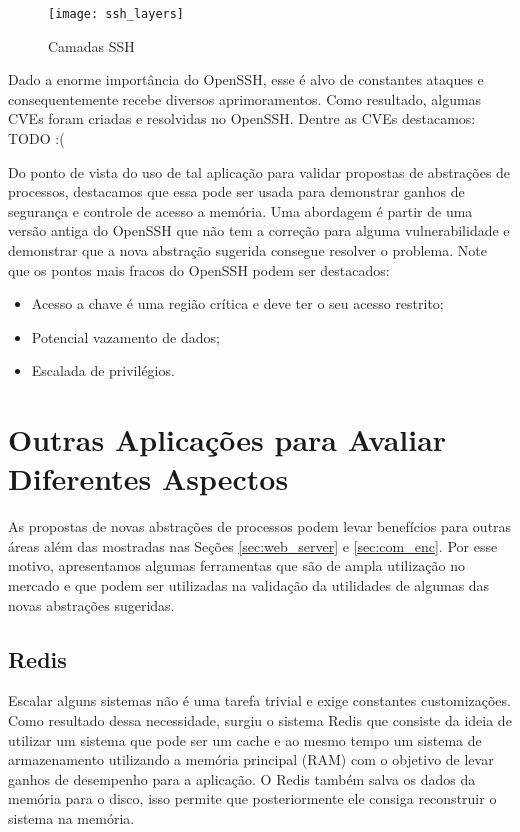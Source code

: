 \begin{figure}[!h]
  \centering
  \texttt{[image: ssh\_layers]}
  \caption{Camadas SSH \citep{opensshhood}}
  \label{fig:openssh_layer}
\end{figure}

Dado a enorme importância do OpenSSH, esse é alvo de constantes ataques e
consequentemente recebe diversos aprimoramentos. Como resultado, algumas CVEs
foram criadas e resolvidas no OpenSSH. Dentre as CVEs destacamos: TODO :(


Do ponto de vista do uso de tal aplicação para validar propostas de abstrações
de processos, destacamos que essa pode ser usada para demonstrar ganhos de
segurança e controle de acesso a memória. Uma abordagem é partir de uma versão
antiga do OpenSSH que não tem a correção para alguma vulnerabilidade e
demonstrar que a nova abstração sugerida consegue resolver o problema. Note que
os pontos mais fracos do OpenSSH podem ser destacados:

\begin{itemize}
  \item Acesso a chave é uma região crítica e deve ter o seu acesso restrito;
  \item Potencial vazamento de dados;
  \item Escalada de privilégios.
\end{itemize}

\section{Outras Aplicações para Avaliar Diferentes Aspectos}

As propostas de novas abstrações de processos podem levar benefícios para
outras áreas além das mostradas nas Seções \ref{sec:web_server} e
\ref{sec:com_enc}. Por esse motivo, apresentamos algumas ferramentas que são de
ampla utilização no mercado e que podem ser utilizadas na validação da
utilidades de algumas das novas abstrações sugeridas.

\subsection{Redis}

Escalar alguns sistemas não é uma tarefa trivial e exige constantes
customizações. Como resultado dessa necessidade, surgiu o sistema Redis que
consiste da ideia de utilizar um sistema que pode ser um cache e ao mesmo tempo
um sistema de armazenamento utilizando a memória principal (RAM) com o objetivo
de levar ganhos de desempenho para a aplicação. O Redis também salva os dados
da memória para o disco, isso permite que posteriormente ele consiga
reconstruir o sistema na memória.

